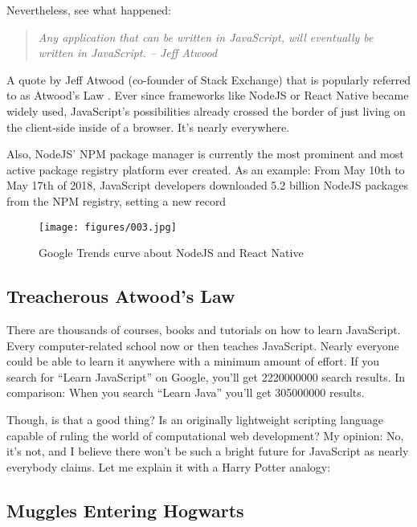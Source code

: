 \documentclass[10pt]{article}
\begin{document}
\begin{sloppypar}
  Nevertheless, see what happened:

  \begin{quote}
    \emph{Any application that can be written in JavaScript, will eventually be written in JavaScript. – Jeff Atwood}
  \end{quote}

  A quote by Jeff Atwood (co-founder of Stack Exchange) that is popularly referred to as Atwood’s Law \citep{atwood_principle_2007}. Ever since frameworks like NodeJS or React Native became widely used, JavaScript’s possibilities already crossed the border of just living on the client-side inside of a browser. It’s nearly everywhere.

  Also, NodeJS’ NPM package manager is currently the most prominent and most active package registry platform ever created. As an example: From May 10th to May 17th of 2018, JavaScript developers downloaded 5.2 billion NodeJS packages from the NPM registry, setting a new record \citep{inc_how_2018}

  \begin{figure}[ht]
    \centering
    \texttt{[image: figures/003.jpg]}
    \caption{Google Trends curve about NodeJS and React Native}
    \label{fig:atwood-law}
  \end{figure}

  \subsection{Treacherous Atwood’s Law}
  \label{sec:atwood-law}

  There are thousands of courses, books and tutorials on how to learn JavaScript. Every computer-related school now or then teaches JavaScript. Nearly everyone could be able to learn it anywhere with a minimum amount of effort. If you search for “Learn JavaScript” on Google, you’ll get \num{2220000000} search results. In comparison: When you search “Learn Java” you’ll get \num{305000000} results.

  Though, is that a good thing? Is an originally lightweight scripting language capable of ruling the world of computational web development? My opinion: No, it’s not, and I believe there won’t be such a bright future for JavaScript as nearly everybody claims. Let me explain it with a Harry Potter analogy:

  \subsection{Muggles Entering Hogwarts}
  \label{sec:muggles}


\end{sloppypar}
\end{document}
